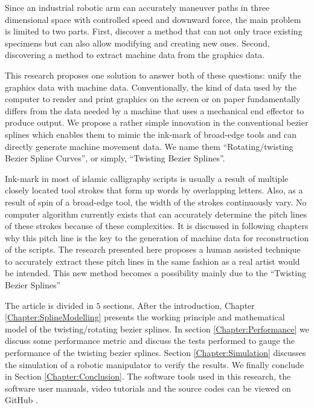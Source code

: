 {    Since an industrial robotic arm can accurately maneuver paths in three dimensional space with controlled speed and downward force, the main problem is limited to two parts. First, discover a method that can not only trace existing specimens but can also allow modifying and creating new ones. Second, discovering a method to extract machine data from the graphics data.
    

    This research proposes one solution to answer both of these questions: unify the graphics data with machine data. Conventionally, the kind of data used by the computer to render and print graphics on the screen or on paper fundamentally differs from the data needed by a machine that uses a mechanical end effector to produce output. We propose a rather simple innovation in the conventional bezier splines which enables them to mimic the ink-mark of broad-edge tools and can directly generate machine movement data. We name them ``Rotating/twisting Bezier Spline Curves'', or simply, ``Twisting Bezier Splines''.

    Ink-mark in most of islamic calligraphy scripts is usually a result of multiple closely located tool strokes that form up words by overlapping letters. Also, as a result of spin of a broad-edge tool, the width of the strokes continuously vary. No computer algorithm currently exists that can accurately determine the pitch lines of these strokes because of these complexities. It is discussed in following chapters why this pitch line is the key to the generation of machine data for reconstruction of the scripts. The research presented here proposes a human assisted technique to accurately extract these pitch lines in the same fashion as a real artist would be intended. This new method becomes a possibility mainly due to the ``Twisting Bezier Splines''

    The article is divided in $5$ sections. After the introduction, Chapter \ref{Chapter:SplineModelling} presents the working principle and mathematical model of the twisting/rotating bezier splines. In section \ref{Chapter:Performance} we discuss some performance metric and discuss the tests performed to gauge the performance of the twisting bezier splines. Section \ref{Chapter:Simulation} discusses the simulation of a robotic manipulator to verify the results. We finally conclude in Section \ref{Chapter:Conclusion}. The software tools used in this research, the software user manuals, video tutorials and the source codes can be viewed on GitHub \cite{bib20}.
    }